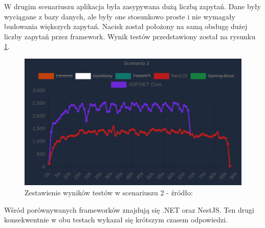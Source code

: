 W drugim scenariuszu aplikacja była zasypywana dużą liczbą zapytań.
Dane były wyciągane z bazy danych, ale były one stosunkowo proste i nie wymagały budowania większych zapytań.
Nacisk został położony na samą obsługę dużej liczby zapytań przez framework.
Wynik testów przedstawiony został na rysunku \ref{rys:oklatest2}.
\begin{figure}[!hb]
	\centering \includegraphics[width=1\linewidth]{rysunki/okla_test_2.png}
	\caption{Zestawienie wyników testów w scenariuszu 2 - źródło: \cite{okami1012024Benchmark}}
	\label{rys:oklatest2}
\end{figure}



Wśród porównywanych frameworków znajdują się .NET oraz NestJS.
Ten drugi konsekwentnie w obu testach wykazał się krótszym czasem odpowiedzi.

